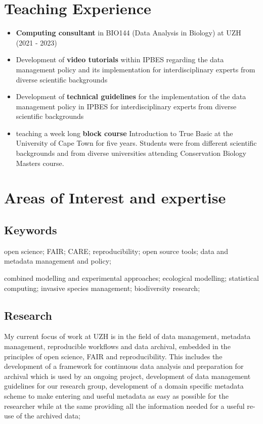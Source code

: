 \documentclass[a4paper]{article}
\begin{document}
\section{Teaching Experience}

\begin{itemize}[leftmargin=1.1in]

\item \textbf{Computing consultant} in BIO144 (Data Analysis in
	Biology) at UZH (2021 - 2023)

\item Development of \textbf{video tutorials} within IPBES regarding
	the data management policy and its implementation for
	interdisciplinary experts from diverse scientific backgrounds

\item Development of \textbf{technical guidelines} for the
	implementation of the data management policy in IPBES for
	interdisciplinary experts from diverse scientific backgrounds

\item teaching a week long \textbf{block course} Introduction to True
	Basic at the University of Cape Town for five years. Students were
	from different scientific backgrounds and from diverse universities
	attending Conservation Biology Masters course.


\end{itemize}

\section{Areas of Interest and expertise}

\subsection{Keywords}

    open science; FAIR; CARE; reproducibility; 
    open source tools; 
    data and metadata management and policy;
     
    combined modelling and experimental approaches;
    ecological modelling; statistical computing; 
	  invasive species management; biodiversity research;

\subsection{Research}


My current focus of work at UZH is in the field of data management,
	metadata management, reproducible workflows and data archival,
	embedded in the principles of open science, FAIR and reproducibility.
	This includes the development of a framework for continuous data
	analysis and preparation for archival which is used by an ongoing
	project, development of data management guidelines for our research
	group, development of a domain specific metadata scheme to make
	entering and useful metadata as easy as possible for the researcher
	while at the same providing all the information needed for a useful
	re-use of the archived data;
\end{document}
